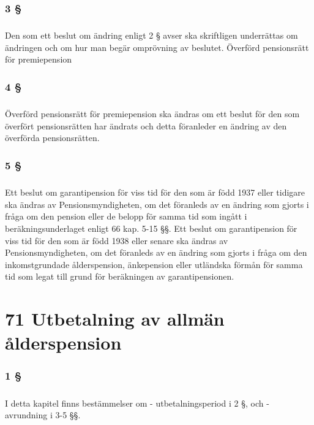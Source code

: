 \documentclass[a4paper,notitlepage,openany,10pt]{book}
\begin{document}
\subsection*{3 §}
\paragraph*{}
Den som ett beslut om ändring enligt 2 § avser ska skriftligen underrättas om ändringen och om hur man begär omprövning av beslutet.
Överförd pensionsrätt för premiepension
\subsection*{4 §}
\paragraph*{}
Överförd pensionsrätt för premiepension ska ändras om ett beslut för den som överfört pensionsrätten har ändrats och detta föranleder en ändring av den överförda pensionsrätten.
\subsection*{5 §}
\paragraph*{}
Ett beslut om garantipension för viss tid för den som är född 1937 eller tidigare ska ändras av Pensionsmyndigheten, om det föranleds av en ändring som gjorts i fråga om den pension eller de belopp för samma tid som ingått i beräkningsunderlaget enligt 66 kap. 5-15 §§.
Ett beslut om garantipension för viss tid för den som är född 1938 eller senare ska ändras av Pensionsmyndigheten, om det föranleds av en ändring som gjorts i fråga om den inkomstgrundade ålderspension, änkepension eller utländska förmån för samma tid som legat till grund för beräkningen av garantipensionen.
\chapter*{71 Utbetalning av allmän ålderspension}
\subsection*{1 §}
\paragraph*{}
I detta kapitel finns bestämmelser om
\newline - utbetalningsperiod i 2 §, och
\newline - avrundning i 3-5 §§.
\end{document}
